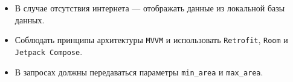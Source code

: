 \begin{itemize}
  \item В случае отсутствия интернета — отображать данные из локальной базы данных.
  \item Соблюдать принципы архитектуры \texttt{MVVM} и использовать \texttt{Retrofit}, \texttt{Room} и \texttt{Jetpack Compose}.
  \item В запросах должны передаваться параметры \texttt{min_area} и \texttt{max_area}.
\end{itemize}
